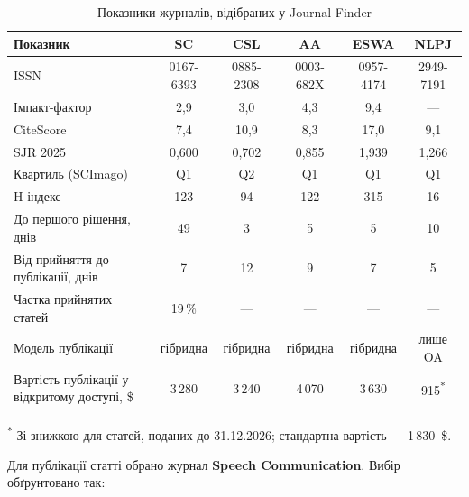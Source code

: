 \documentclass[14pt,a4paper]{extreport}
\begin{document}
\begin{table}[H]
\caption{Показники журналів, відібраних у Journal Finder}
\label{tab:journals}
\small
\begin{tabularx}{\linewidth}{|X|c|c|c|c|c|}
\hline
\textbf{Показник} & \textbf{SC} & \textbf{CSL} & \textbf{AA} & \textbf{ESWA} & \textbf{NLPJ} \\
\hline
ISSN & 0167-6393 & 0885-2308 & 0003-682X & 0957-4174 & 2949-7191 \\
\hline
Імпакт-фактор & 2,9 & 3,0 & 4,3 & 9,4 & — \\
\hline
CiteScore & 7,4 & 10,9 & 8,3 & 17,0 & 9,1 \\
\hline
SJR 2025 & 0,600 & 0,702 & 0,855 & 1,939 & 1,266 \\
\hline
Квартиль (SCImago) & Q1 & Q2 & Q1 & Q1 & Q1 \\
\hline
H-індекс & 123 & 94 & 122 & 315 & 16 \\
\hline
До першого рішення, днів & 49 & 3 & 5 & 5 & 10 \\
\hline
Від прийняття до публікації, днів & 7 & 12 & 9 & 7 & 5 \\
\hline
Частка прийнятих статей & 19\,\% & — & — & — & — \\
\hline
Модель публікації & гібридна & гібридна & гібридна & гібридна & лише OA \\
\hline
Вартість публікації у відкритому доступі, \$ & 3\,280 & 3\,240 & 4\,070 & 3\,630 & 915\textsuperscript{*} \\
\hline
\end{tabularx}

\medskip
\footnotesize\textsuperscript{*} Зі знижкою для статей, поданих до 31.12.2026; стандартна вартість — 1\,830~\$.
\end{table}

Для публікації статті обрано журнал \textbf{Speech Communication}. Вибір обґрунтовано так:
\end{document}
